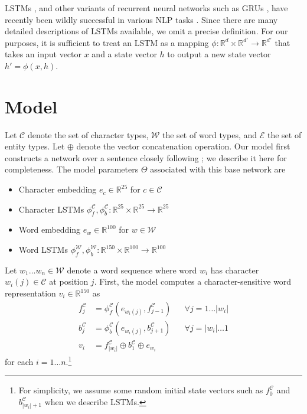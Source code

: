 \documentclass[11pt,letterpaper,UTF8]{article}
\newcommand{\R}{\ensuremath{\mathbb{R}}}
\newcommand{\ra}{\ensuremath{\rightarrow}}
\newcommand{\paren}[1]{\left(#1\right)}
\newcommand{\abs}[1]{\left|#1\right|}
\begin{document}
LSTMs \cite{hochreiter1997long}, and other variants of recurrent neural networks such as GRUs \cite{chung2014empirical},
have recently been wildly successful in various NLP tasks \cite{lample2016neural,TACL885,chung2014empirical}.
Since there are many detailed descriptions of LSTMs available, we omit a precise definition.
For our purposes, it is sufficient to treat an LSTM as a mapping
$\phi:\R^d \times \R^{d'} \ra \R^{d'}$ that takes an input vector $x$ and a state vector $h$
to output a new state vector $h' = \phi(x, h)$.

\section{Model}
\label{sec:model}

Let $\mathcal{C}$ denote the set of character types,
$\mathcal{W}$ the set of word types, and
$\mathcal{E}$ the set of entity types.
Let $\oplus$ denote the vector concatenation operation.
Our model first constructs a network over a sentence closely following ; we describe it here for completeness.
The model parameters $\Theta$ associated with this base network are
\begin{itemize}
\item Character embedding $e_c \in \R^{25}$ for $c \in \mathcal{C}$
\item Character LSTMs $\phi^{\mathcal{C}}_f, \phi^{\mathcal{C}}_b: \R^{25} \times \R^{25} \ra \R^{25}$
\item Word embedding $e_w \in \R^{100}$ for $w \in \mathcal{W}$
\item Word LSTMs $\phi^{\mathcal{W}}_f, \phi^{\mathcal{W}}_b: \R^{150} \times \R^{100} \ra \R^{100}$
\end{itemize}
Let $w_1 \ldots w_n \in \mathcal{W}$ denote a word sequence where word $w_i$ has character $w_i(j) \in \mathcal{C}$ at position $j$.
First, the model computes a character-sensitive word representation $v_i \in \R^{150}$ as
\begin{align*}
f^{\mathcal{C}}_j &= \phi^{\mathcal{C}}_f\paren{e_{w_i(j)}, f^{\mathcal{C}}_{j-1}} &&\forall j = 1 \ldots \abs{w_i} \\
b^{\mathcal{C}}_j &= \phi^{\mathcal{C}}_b\paren{e_{w_i(j)}, b^{\mathcal{C}}_{j+1}} &&\forall j = \abs{w_i} \ldots 1\\
v_i &= f^{\mathcal{C}}_{\abs{w_i}} \oplus b^{\mathcal{C}}_1 \oplus e_{w_i} &&
\end{align*}
for each $i = 1 \ldots n$.\footnote{For simplicity, we assume some random initial
state vectors such as $f^{\mathcal{C}}_0$ and $b^{\mathcal{C}}_{\abs{w_i}+1}$ when we describe LSTMs.}
\end{document}
